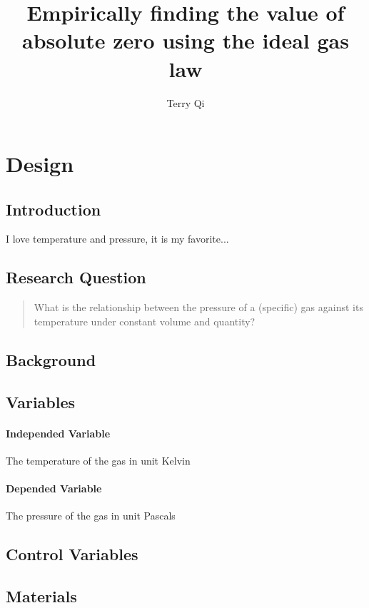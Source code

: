 \documentclass[a4paper,12pt]{article}
\title{Empirically finding the value of absolute zero using the ideal gas law}
\author{Terry Qi}
\begin{document}
\maketitle

\section{Design}
\subsection{Introduction}
I love temperature and pressure, it is my favorite...

\subsection{Research Question}
\begin{quote}
    What is the relationship between the pressure of a (specific) gas against its temperature under constant volume and quantity?
\end{quote}

\subsection{Background}

\subsection{Variables}
\paragraph{Independed Variable}
The temperature of the gas in unit Kelvin

\paragraph{Depended Variable}
The pressure of the gas in unit Pascals

\subsection{Control Variables}


\subsection{Materials}
\end{document}
